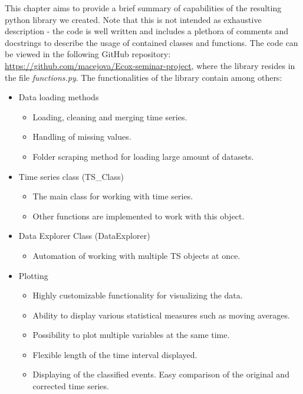 \documentclass[12pt,a4paper]{article}
\begin{document}
This chapter aims to provide a brief summary of capabilities of the resulting python library we created. Note that this is not intended as exhaustive description - the code is well written and includes a plethora of comments and docstrings to describe the usage of contained classes and functions. The code can be viewed in the following GitHub repository: 
\url{https://github.com/macejova/Ecox-seminar-project}, where the library resides in the file \textit{functions.py}. The functionalities of the library contain among others:
\begin{itemize}
    \item Data loading methods
    \begin{itemize}
        \item Loading, cleaning and merging time series.
        \item Handling of missing values.
        \item Folder scraping method for loading large amount of datasets.
    \end{itemize}
    
    \item Time series class (TS\_Class)
    \begin{itemize}
        \item The main class for working with time series.
        \item Other functions are implemented to work with this object.
    \end{itemize}

    \item Data Explorer Class (DataExplorer)
        \begin{itemize}
            \item Automation of working with multiple TS objects at once.
        \end{itemize}

    
    \item Plotting
    \begin{itemize}
        \item Highly customizable functionality for visualizing the data.
        \item Ability to display various statistical measures such as moving averages.
        \item Possibility to plot multiple variables at the same time.
        \item Flexible length of the time interval displayed.
        \item Displaying of the classified events. Easy comparison of the original and corrected time series.
    \end{itemize}
    

\end{itemize}
\end{document}
